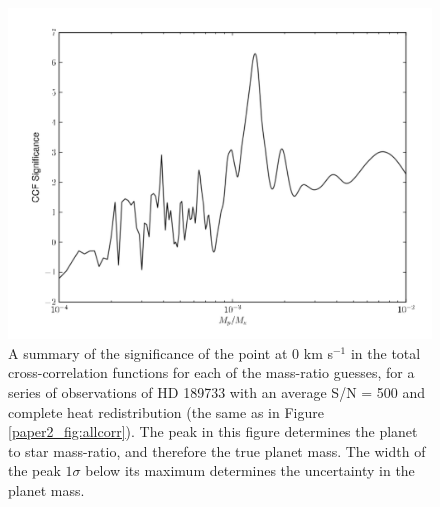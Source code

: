 \begin{figure}[t]
  \centering
  \includegraphics[width=6.5in]{Figures/paper2_fig4.pdf}
  \caption{A summary of the significance of the point at 0 km s$^{-1}$ in the total cross-correlation functions for each of the mass-ratio guesses, for a series of observations of HD 189733 with an average S/N = 500 and complete heat redistribution (the same as in Figure \ref{paper2_fig:allcorr}). The peak in this figure determines the planet to star mass-ratio, and therefore the true planet mass. The width of the peak $1 \sigma$ below its maximum determines the uncertainty in the planet mass.}
  \label{paper2_fig:massratio}
\end{figure}
